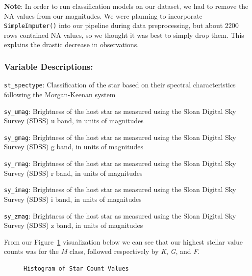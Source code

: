 \documentclass[
  letterpaper,
  DIV=11,
  numbers=noendperiod]{scrartcl}
\begin{document}
\textbf{Note}: In order to run classification models on our dataset, we
had to remove the NA values from our magnitudes. We were planning to
incorporate \texttt{SimpleImputer()} into our pipeline during data
preprocessing, but about 2200 rows contained NA values, so we thought it
was best to simply drop them. This explains the drastic decrease in
observations.

\subsubsection{Variable Descriptions:}\label{variable-descriptions}

\texttt{st\_spectype}: Classification of the star based on their
spectral characteristics following the Morgan-Keenan system

\texttt{sy\_umag}: Brightness of the host star as measured using the
Sloan Digital Sky Survey (SDSS) u band, in units of magnitudes

\texttt{sy\_gmag}: Brightness of the host star as measured using the
Sloan Digital Sky Survey (SDSS) g band, in units of magnitudes

\texttt{sy\_rmag}: Brightness of the host star as measured using the
Sloan Digital Sky Survey (SDSS) r band, in units of magnitudes

\texttt{sy\_imag}: Brightness of the host star as measured using the
Sloan Digital Sky Survey (SDSS) i band, in units of magnitudes

\texttt{sy\_zmag}: Brightness of the host star as measured using the
Sloan Digital Sky Survey (SDSS) z band, in units of magnitudes

From our Figure~\ref{fig-sy-umag} visualization below we can see that
our highest stellar value counts was for the \emph{M} class, followed
respectively by \emph{K}, \emph{G}, and \emph{F}.

\begin{figure}[H]


\caption{\label{fig-sy-umag}\texttt{Histogram\ of\ Star\ Count\ Values}}

\end{figure}%
\end{document}
